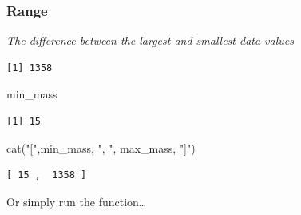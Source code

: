 \documentclass[
  letterpaper,
  DIV=11,
  numbers=noendperiod]{scrartcl}
\newenvironment{Shaded}{\begin{snugshade}}{\end{snugshade}}
\newcommand{\AttributeTok}[1]{\textcolor[rgb]{0.40,0.45,0.13}{#1}}
\newcommand{\ConstantTok}[1]{\textcolor[rgb]{0.56,0.35,0.01}{#1}}
\newcommand{\FunctionTok}[1]{\textcolor[rgb]{0.28,0.35,0.67}{#1}}
\newcommand{\NormalTok}[1]{\textcolor[rgb]{0.00,0.23,0.31}{#1}}
\newcommand{\OtherTok}[1]{\textcolor[rgb]{0.00,0.23,0.31}{#1}}
\newcommand{\SpecialCharTok}[1]{\textcolor[rgb]{0.37,0.37,0.37}{#1}}
\newcommand{\StringTok}[1]{\textcolor[rgb]{0.13,0.47,0.30}{#1}}
\begin{document}
\subsubsection{Range}\label{range}

\emph{The difference between the largest and smallest data values}

\begin{Shaded}
\end{Shaded}

\begin{verbatim}
[1] 1358
\end{verbatim}

\begin{Shaded}
\begin{Highlighting}[]
\NormalTok{min\_mass}
\end{Highlighting}
\end{Shaded}

\begin{verbatim}
[1] 15
\end{verbatim}

\begin{Shaded}
\begin{Highlighting}[]
\FunctionTok{cat}\NormalTok{(}\StringTok{"["}\NormalTok{,min\_mass, }\StringTok{", "}\NormalTok{, max\_mass, }\StringTok{"]"}\NormalTok{)}
\end{Highlighting}
\end{Shaded}

\begin{verbatim}
[ 15 ,  1358 ]
\end{verbatim}

Or simply run the function\ldots{}

\begin{Shaded}
\end{Shaded}
\end{document}
